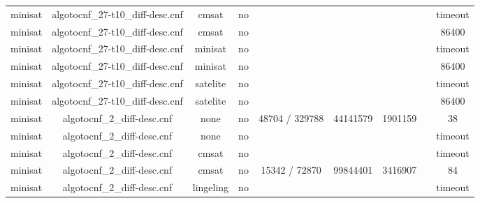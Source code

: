 \begin{appendices}
\begin{table}[p]
\begin{center}
\begin{tabular}{l|cccccccc}
  minisat                        & algotocnf\_27-t10\_diff-desc.cnf & cmsat      & no    &            &           &           &            & timeout \\ %
  minisat                        & algotocnf\_27-t10\_diff-desc.cnf & cmsat      & no    &            &           &           &            & 86400 \\ %
  minisat                        & algotocnf\_27-t10\_diff-desc.cnf & minisat    & no    &            &           &           &            & timeout \\ %
  minisat                        & algotocnf\_27-t10\_diff-desc.cnf & minisat    & no    &            &           &           &            & 86400 \\ %
  minisat                        & algotocnf\_27-t10\_diff-desc.cnf & satelite   & no    &            &           &           &            & timeout \\ %
  minisat                        & algotocnf\_27-t10\_diff-desc.cnf & satelite   & no    &            &           &           &            & 86400 \\ %
  minisat                        & algotocnf\_2\_diff-desc.cnf    & none       & no    & 48704 / 329788 & 44141579  & 1901159   &            & 38 \\ %
  minisat                        & algotocnf\_2\_diff-desc.cnf    & none       & no    &            &           &           &            & timeout \\ %
  minisat                        & algotocnf\_2\_diff-desc.cnf    & cmsat      & no    &            &           &           &            & timeout \\ %
  minisat                        & algotocnf\_2\_diff-desc.cnf    & cmsat      & no    & 15342 / 72870 & 99844401  & 3416907   &            & 84 \\ %
  minisat                        & algotocnf\_2\_diff-desc.cnf    & lingeling  & no    &            &           &           &            & timeout \\ %

\end{tabular}
\end{center}
\end{table}
\end{appendices}
